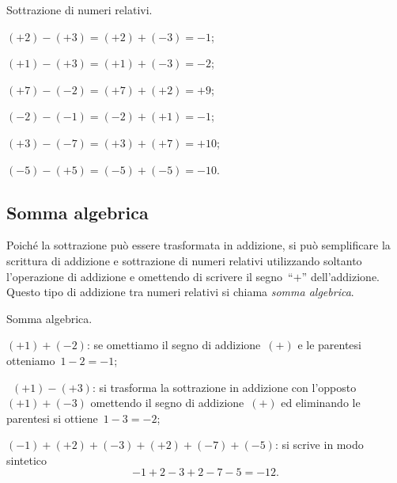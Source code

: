 \begin{exrig}
 \begin{esempio}
 Sottrazione di numeri relativi.
\begin{multicols}{2}
 \begin{itemize*}
\item $(+2)-(+3)=(+2)+(-3)=-1$;
\item $(+1)-(+3)=(+1)+(-3)=-2$;
\item $(+7)-(-2)=(+7)+(+2)=+9$;
\item $(-2)-(-1)=(-2)+(+1)=-1$;
\item $(+3)-(-7)=(+3)+(+7)=+10$;
\item $(-5)-(+5)=(-5)+(-5)=-10$.
 \end{itemize*}
\end{multicols}
 \end{esempio}
\end{exrig}

\begin{figure}[ht]
 \centering
 \caption{}
\end{figure}

\ovalbox{\risolvii \ref{ese:2.9}, \ref{ese:2.10}, \ref{ese:2.11}, \ref{ese:2.12}, \ref{ese:2.13}}

\subsection{Somma algebrica}

Poiché la sottrazione può essere trasformata in addizione, si può semplificare la scrittura di addizione
e sottrazione di numeri relativi utilizzando soltanto l'operazione di addizione e omettendo di scrivere
il segno~``$+$'' dell'addizione. Questo tipo di addizione tra numeri relativi si chiama \emph{somma algebrica}.

\begin{exrig}
 \begin{esempio} Somma algebrica.
  \begin{itemize*}
  \item $(+1)+(-2)$: se omettiamo il segno di addizione~$(+)$ e le parentesi otteniamo~$1-2=-1$;
  \item ~$(+1)-(+3)$: si trasforma la sottrazione in addizione con l'opposto~$(+1)+(-3)$ omettendo il segno
  di addizione~$(+)$ ed eliminando le parentesi si ottiene~$1-3=-2$;
  \item $(-1)+(+2)+(-3)+(+2)+(-7)+(-5)$: si scrive in modo sintetico \[-1+2-3+2-7-5=-12.\]
  \end{itemize*}
 \end{esempio}
\end{exrig}

